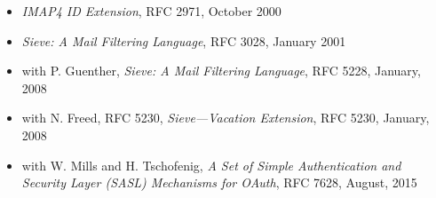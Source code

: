 \documentclass[letterpaper,12pt,twoside]{article}
\begin{document}
\vspace{-6pt}
\begin{itemize}
\item {\sl IMAP4 ID Extension}, RFC 2971, October 2000
\item {\sl Sieve: A Mail Filtering Language}, RFC 3028, January 2001
\item with P. Guenther, {\sl Sieve: A Mail Filtering Language}, RFC
  5228, January, 2008
\item with N. Freed, RFC 5230, {\sl Sieve---Vacation Extension}, RFC
  5230, January, 2008
\item with W. Mills and H. Tschofenig, {\sl A Set of Simple Authentication and
  Security Layer (SASL) Mechanisms for OAuth}, RFC 7628, August, 2015
\end{itemize}
\end{document}
